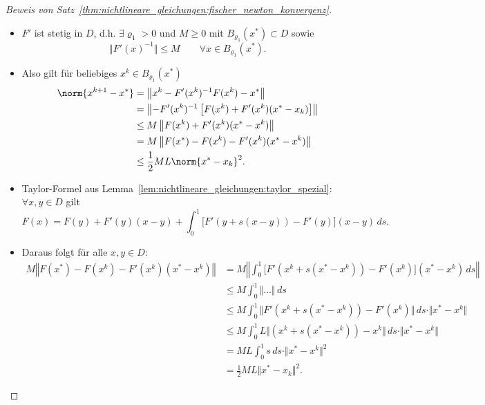\begin{proof}[Beweis von Satz~\ref{thm:nichtlineare_gleichungen:fischer_newton_konvergenz}]\mbox{}\\
\begin{itemize}
 \item $F'$ ist stetig in $D$, d.h. $\exists \varrho_1>0$ und $M \ge 0$ mit $B_{\varrho_1}(x^*) \subset D$
  sowie
\begin{equation*}
 \Vert F'(x)^{-1} \Vert \leq M
 \qquad
 \forall x \in B_{\varrho_1}(x^*).
\end{equation*}

 \item Also gilt für beliebiges $x^k \in B_{\varrho_1} (x^*)$
  \begin{align*}
   \norm{x^{k+1}-x^*}
   & =
   \big\Vert x^k-F'(x^k)^{-1} F(x^k) - x^* \big\Vert \\
   & =
   \left\Vert -F' (x^k)^{-1} \left[ F(x^k)+F'(x^k)(x^* -x_k) \right] \right\Vert \\
   & \leq
   M \left\Vert F(x^k) + F'(x^k) (x^*-x^k) \right\Vert \\
   & = M \left\Vert F(x^*)-F(x^k)-F'(x^k) (x^*-x^k) \right\Vert \\
   & \leq
   \frac{1}{2}ML \norm{x^*-x_k}^2.
\end{align*}

 \item Taylor-Formel aus Lemma~\ref{lem:nichtlineare_gleichungen:taylor_spezial}: $\forall x,y \in D$ gilt
  \begin{equation*}
   F(x)=F(y)+F'(y)(x-y)+\int_0^1 \Big[F'(y+s(x-y))-F'(y)\Big](x-y)\,ds.
  \end{equation*}

 \item Daraus folgt für alle $x,y \in D$:
  \begin{align*}
   M \left\Vert F(x^*)-F(x^k)-F'(x^k)(x^*-x^k) \right\Vert
   & =
   M \left\Vert \int_0^1 \Big[ F'(x^k+s(x^*-x^k))-F'(x^k) \Big](x^*-x^k)\,ds \right\Vert \\
   & \leq M \int_0^1 \Vert \ldots \Vert \, ds \\
   & \leq M \int_0^1 \Vert F'(x^k+s(x^*-x^k))-F'(x^k) \Vert \,ds \cdot \Vert x^*-x^k \Vert \\
   & \leq M \int_0^1 L \Vert (x^k+s(x^*-x^k))-x^k \Vert \,ds \cdot \Vert x^*-x^k \Vert \\
   & = M L \int_0^1 s \,ds \cdot \Vert x^*-x^k \Vert^2 \\
   & = \frac{1}{2} M L \Vert x^*-x_k \Vert^2.
  \end{align*}



\end{itemize}
\end{proof}
